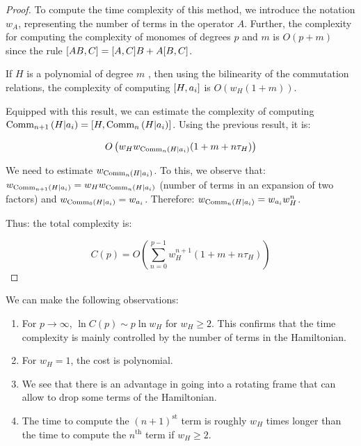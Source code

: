 \begin{proof}
    To compute the time complexity of this method, we introduce the notation $w_A$, representing the number of terms in the operator $A$. Further, the complexity for computing the complexity of monomes of degrees $p$ and $m$ is $O(p+m)$ since the rule $\commutator{A B}{C} = \commutator{A}{C} B + A \commutator{B}{C}$.

    If $H$ is a polynomial of degree $m$ , then using the bilinearity of the commutation relations, the complexity of computing $\commutator{H}{a_i}$ is $O(w_H (1+m))$.

    Equipped with this result, we can estimate the complexity of computing $\Comm{n+1}{H}{a_i} = \commutator{H}{\Comm{n}{H}{a_i}}$. Using the previous result, it is:

    $$O\left(w_H w_{\text{Comm}_{n}\left(H | a_i\right)} (1+m+n \tau_H)\right)$$

    We need to estimate $w_{\text{Comm}_{n}\left(H | a_i\right)}$. To this, we observe that: $w_{\text{Comm}_{n+1}\left(H | a_i\right)} = w_H w_{\text{Comm}_{n}\left(H | a_i\right)}$ (number of terms in an expansion of two factors) and $w_{\text{Comm}_{0}\left(H | a_i\right)} = w_{a_i}$. Therefore: $w_{\text{Comm}_{n}\left(H | a_i\right)} = w_{a_i} w^n_H$.

    Thus: the total complexity is:

    \begin{equation}
        C(p) = O\left(\sum_{n=0}^{p-1} w^{n+1}_H (1+m+n \tau_H)\right)
    \end{equation}
\end{proof}

\begin{remark} We can make the following observations:
    \begin{enumerate}
        \item For $p \rightarrow \infty$, $\ln{C(p)} \sim p \ln{w_H}$ for $w_H \ge 2$. This confirms that the time complexity is mainly controlled by the number of terms in the Hamiltonian.
        \item For $w_H = 1$, the cost is polynomial.
        \item We see that there is an advantage in going into a    rotating frame that can allow to drop some terms of the Hamiltonian.
        \item The time to compute the $(n + 1)^{\text{st}}$ term is roughly $w_H$ times longer than the time to compute the $n^{\text{th}}$ term if $w_H \ge 2$.
    \end{enumerate}
    
\end{remark}

